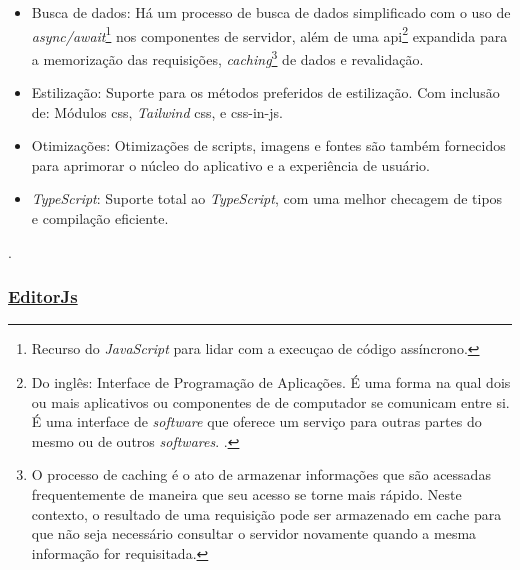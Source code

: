 \begin{itemize}
	\item Busca de dados: Há um processo de busca de dados simplificado com o uso de
                    \textit{async/await}\footnote{Recurso do \textit{JavaScript} para lidar com a execuçao de código assíncrono.
                    }
                    nos componentes de servidor, além de uma
                    \acrshort{api}\footnote{Do inglês: Interface de Programação de Aplicações. É uma forma na qual
                        dois ou mais aplicativos ou componentes de de computador se comunicam
                        entre si. É uma interface de \textit{software} que oferece um serviço para outras
                        partes do mesmo ou de outros \textit{softwares}.
                        \cite{api-reddy}.
                    }
                    expandida para a memorização das
                    requisições,
                    \textit{caching}\footnote{O processo de caching é o ato de armazenar informações que são acessadas
                        frequentemente de maneira que seu acesso se torne mais rápido. Neste contexto,
                        o resultado de uma requisição pode ser armazenado em cache para que não
                        seja necessário consultar o servidor novamente quando a mesma informação
                        for requisitada.
                    }
                    de dados e revalidação.
                
	\item Estilização: Suporte para os métodos preferidos de estilização. Com inclusão
                    de: Módulos \acrshort{css}, \textit{Tailwind} \acrshort{css},
                    e \acrshort{css}-in-\acrshort{js}.
                
	\item Otimizações: Otimizações de scripts, imagens e fontes são também fornecidos para aprimorar
                    o núcleo do aplicativo e a experiência de usuário.
                
	\item \textit{TypeScript}: Suporte total ao \textit{TypeScript}, com uma melhor checagem de tipos e compilação eficiente.
                
    
\end{itemize}

\cite{nexjs-docs}.
            

\subsubsection{\underline{EditorJs}}

